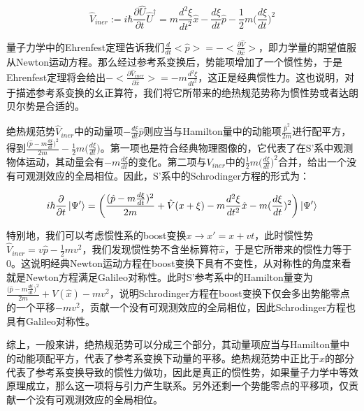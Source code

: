 \documentclass[a4paper]{article}
\begin{document}
        \begin{equation}
            \hat{V}_{iner} := i\hbar\frac{\partial\hat{U}}{\partial t}\hat{U}^\dagger = m \frac{d^2\xi}{d t^2}\hat{x}-\frac{d\xi}{dt}\hat{p}-\frac{1}{2}m\bigg(\frac{d\xi}{dt}\bigg)^2
        \end{equation}

        量子力学中的Ehrenfest定理告诉我们$\frac{d}{dt}<\hat{p}>=-<\frac{\partial\hat{V}}{\partial \hat{x}}>$，即力学量的期望值服从Newton运动方程。那么经过参考系变换后，势能项增加了一个惯性势，于是Ehrenfest定理将会给出$-<\frac{\partial\hat{V}_{iner}}{\partial \hat{x}}>=-m \frac{d^2\xi}{d t^2}$，这正是经典惯性力。这也说明，对于描述参考系变换的幺正算符，我们将它所带来的绝热规范势称为惯性势或者达朗贝尔势是合适的。

        绝热规范势$\hat{V}_{iner}$中的动量项$-\frac{d\xi}{dt}\hat{p}$则应当与Hamilton量中的动能项$\frac{\hat{p}^2}{2m}$进行配平方，得到$\frac{\big(\hat{p}-m\frac{d\xi}{dt}\big)^2}{2m}-\frac{1}{2}m\big(\frac{d\xi}{dt}\big)$。第一项也是符合经典物理图像的，它代表了在S'系中观测物体运动，其动量会有$-m\frac{d\xi}{dt}$的变化。第二项与$V_{iner}$中的$\frac{1}{2}m\big(\frac{d\xi}{dt}\big)^2$合并，给出一个没有可观测效应的全局相位。因此，S'系中的Schrodinger方程的形式为：

        \begin{equation}
            i\hbar\frac{\partial}{\partial t}\ket{\Psi'} = \biggl(\frac{(\hat{p}-m\frac{d\xi}{dt})^2}{2m}+\hat{V}(x+\xi)-m\frac{d^2\xi}{dt^2}\hat{x}-m(\frac{d\xi}{dt})^2\biggr) \ket{\Psi'}
        \end{equation}
        
        特别地，我们可以考虑惯性系的boost变换$x\rightarrow x'=x+vt$，此时惯性势$\hat{V}_{iner}=v\hat{p}-\frac{1}{2}mv^2$，我们发现惯性势不含坐标算符$\hat{x}$，于是它所带来的惯性力等于0。这说明经典Newton运动方程在boost变换下具有不变性，从对称性的角度来看就是Newton方程满足Galileo对称性。此时S'参考系中的Hamilton量变为$\frac{\big(\hat{p}-m\frac{d\xi}{dt}\big)^2}{2m}+V(\hat{x})-mv^2$，说明Schrodinger方程在boost变换下仅会多出势能零点的一个平移$-mv^2$，贡献一个没有可观测效应的全局相位，因此Schrodinger方程也具有Galileo对称性。

        综上，一般来讲，绝热规范势可以分成三个部分，其动量项应当与Hamilton量中的动能项配平方，代表了参考系变换下动量的平移。绝热规范势中正比于$\hat{x}$的部分代表了参考系变换导致的惯性力做功，因此是真正的惯性势，如果量子力学中等效原理成立，那么这一项将与引力产生联系。另外还剩一个势能零点的平移项，仅贡献一个没有可观测效应的全局相位。
\end{document}
